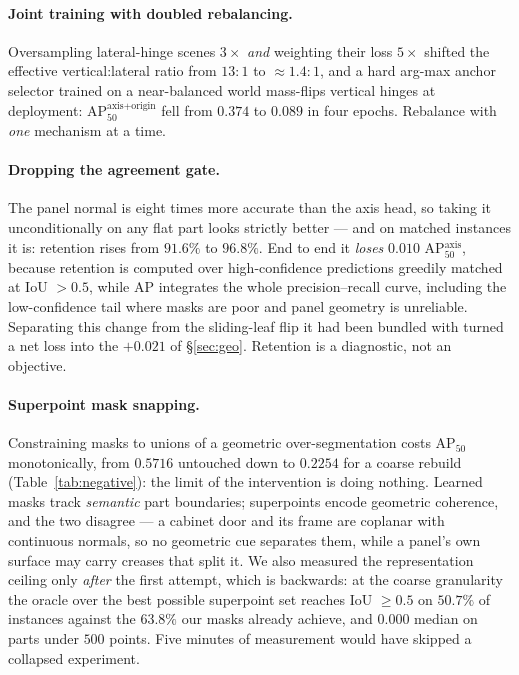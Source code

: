 \documentclass[11pt]{article}
\newcommand{\metric}{AP$_{50}^{\text{axis+origin}}$}
\newcommand{\apfifty}{AP$_{50}$}
\begin{document}
\endgroup

\paragraph{Joint training with doubled rebalancing.} Oversampling
lateral-hinge scenes $3\times$ \emph{and} weighting their loss $5\times$
shifted the effective vertical:lateral ratio from $13{:}1$ to
$\approx 1.4{:}1$, and a hard arg-max anchor selector trained on a
near-balanced world mass-flips vertical hinges at deployment: \metric{}
fell from $0.374$ to $0.089$ in four epochs. Rebalance with \emph{one}
mechanism at a time.

\paragraph{Dropping the agreement gate.} The panel normal is eight times
more accurate than the axis head, so taking it unconditionally on any flat
part looks strictly better --- and on matched instances it is: retention
rises from $91.6\%$ to $96.8\%$. End to end it \emph{loses} $0.010$
AP$_{50}^{\text{axis}}$, because retention is computed over
high-confidence predictions greedily matched at IoU $>0.5$, while AP
integrates the whole precision--recall curve, including the low-confidence
tail where masks are poor and panel geometry is unreliable. Separating this
change from the sliding-leaf flip it had been bundled with turned a net
loss into the $+0.021$ of \S\ref{sec:geo}. Retention is a diagnostic, not
an objective.

\paragraph{Superpoint mask snapping.} Constraining masks to unions of a
geometric over-segmentation costs \apfifty{} monotonically, from $0.5716$
untouched down to $0.2254$ for a coarse rebuild (Table~\ref{tab:negative}):
the limit of the intervention is doing nothing. Learned masks track
\emph{semantic} part boundaries; superpoints encode geometric coherence,
and the two disagree --- a cabinet door and its frame are coplanar with
continuous normals, so no geometric cue separates them, while a panel's own
surface may carry creases that split it. We also measured the
representation ceiling only \emph{after} the first attempt, which is
backwards: at the coarse granularity the oracle over the best possible
superpoint set reaches IoU $\geq 0.5$ on $50.7\%$ of instances against the
$63.8\%$ our masks already achieve, and $0.000$ median on parts under $500$
points. Five minutes of measurement would have skipped a collapsed
experiment.
\end{document}
